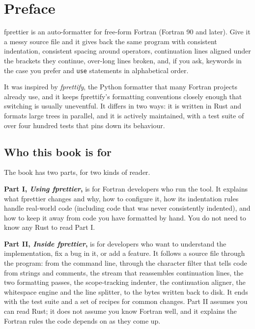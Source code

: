 \documentclass[11pt,a4paper,openany]{book}
\newcommand{\code}[1]{\texttt{\small #1}}
\begin{document}
\tableofcontents

\chapter{Preface}

fprettier is an auto-formatter for free-form Fortran (Fortran 90 and later). Give it a
messy source file and it gives back the same program with consistent
indentation, consistent spacing around operators, continuation lines aligned
under the brackets they continue, over-long lines broken, and, if you ask,
keywords in the case you prefer and \code{use} statements in alphabetical order.

It was inspired by \emph{fprettify}, the Python formatter that many Fortran
projects already use, and it keeps fprettify's formatting
conventions closely enough that switching is usually uneventful. It differs in
two ways: it is written in Rust and formats large trees in parallel, and it is
actively maintained, with a test suite of over four hundred tests that pins
down its behaviour.

\section*{Who this book is for}

The book has two parts, for two kinds of reader.

\textbf{Part I, \emph{Using fprettier},} is for Fortran developers who run the
tool. It explains what fprettier changes and why, how to configure it, how
its indentation rules handle real-world code (including code that was never
consistently indented), and how to keep it away from code you have formatted by
hand. You do not need to know any Rust to read Part I.

\textbf{Part II, \emph{Inside fprettier},} is for developers who want to understand
the implementation, fix a bug in it, or add a feature. It follows a source file
through the program: from the command line, through the character filter that
tells code from strings and comments, the stream that reassembles continuation
lines, the two formatting passes, the scope-tracking indenter, the continuation
aligner, the whitespace engine and the line splitter, to the bytes written
back to disk. It ends with the test suite and a set of recipes for common
changes. Part II assumes you can read Rust; it does not assume you know
Fortran well, and it explains the Fortran rules the code depends on as they come up.
\end{document}
